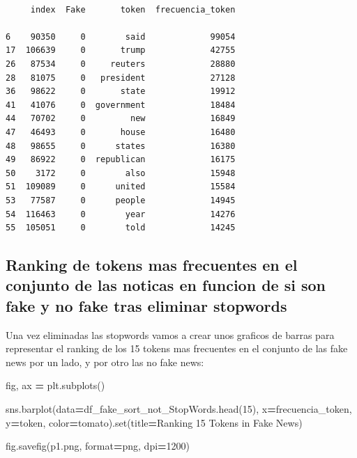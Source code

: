 \documentclass[
  11pt,
  a4paper,
]{article}
\newenvironment{Shaded}{\begin{snugshade}}{\end{snugshade}}
\newcommand{\BuiltInTok}[1]{#1}
\newcommand{\DecValTok}[1]{\textcolor[rgb]{0.00,0.00,0.81}{#1}}
\newcommand{\NormalTok}[1]{#1}
\newcommand{\OperatorTok}[1]{\textcolor[rgb]{0.81,0.36,0.00}{\textbf{#1}}}
\newcommand{\StringTok}[1]{\textcolor[rgb]{0.31,0.60,0.02}{#1}}
\begin{document}
\begin{verbatim}

     index  Fake       token  frecuencia_token
     
6    90350     0        said             99054
17  106639     0       trump             42755
26   87534     0     reuters             28880
28   81075     0   president             27128
36   98622     0       state             19912
41   41076     0  government             18484
44   70702     0         new             16849
47   46493     0       house             16480
48   98655     0      states             16380
49   86922     0  republican             16175
50    3172     0        also             15948
51  109089     0      united             15584
53   77587     0      people             14945
54  116463     0        year             14276
55  105051     0        told             14245
\end{verbatim}

\hypertarget{ranking-de-tokens-mas-frecuentes-en-el-conjunto-de-las-noticas-en-funcion-de-si-son-fake-y-no-fake-tras-eliminar-stopwords}{%
\subsection{Ranking de tokens mas frecuentes en el conjunto de las
noticas en funcion de si son fake y no fake tras eliminar
stopwords}\label{ranking-de-tokens-mas-frecuentes-en-el-conjunto-de-las-noticas-en-funcion-de-si-son-fake-y-no-fake-tras-eliminar-stopwords}}

Una vez eliminadas las stopwords vamos a crear unos graficos de barras
para representar el ranking de los 15 tokens mas frecuentes en el
conjunto de las fake news por un lado, y por otro las no fake news:

\begin{Shaded}
\begin{Highlighting}[]
\NormalTok{fig, ax }\OperatorTok{=}\NormalTok{ plt.subplots()}

\NormalTok{sns.barplot(data}\OperatorTok{=}\NormalTok{df\_fake\_sort\_not\_StopWords.head(}\DecValTok{15}\NormalTok{), x}\OperatorTok{=}\StringTok{\textquotesingle{}frecuencia\_token\textquotesingle{}}\NormalTok{, y}\OperatorTok{=}\StringTok{\textquotesingle{}token\textquotesingle{}}\NormalTok{, color}\OperatorTok{=}\StringTok{\textquotesingle{}tomato\textquotesingle{}}\NormalTok{).}\BuiltInTok{set}\NormalTok{(title}\OperatorTok{=}\StringTok{\textquotesingle{}Ranking 15 Tokens in Fake News\textquotesingle{}}\NormalTok{) }

\NormalTok{fig.savefig(}\StringTok{\textquotesingle{}p1.png\textquotesingle{}}\NormalTok{, }\BuiltInTok{format}\OperatorTok{=}\StringTok{\textquotesingle{}png\textquotesingle{}}\NormalTok{, dpi}\OperatorTok{=}\DecValTok{1200}\NormalTok{)}
\end{Highlighting}
\end{Shaded}
\end{document}
